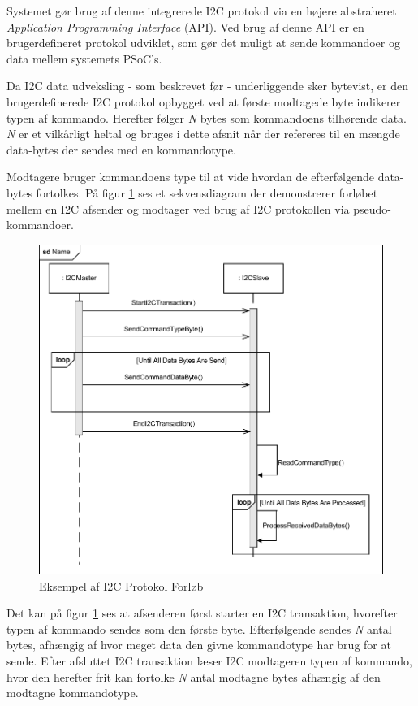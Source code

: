 Systemet gør brug af denne integrerede I2C protokol via en højere abstraheret \textit{Application Programming Interface} (API). Ved brug af denne API er en brugerdefineret protokol udviklet, som gør det muligt at sende kommandoer og data mellem systemets PSoC's.

Da I2C data udveksling - som beskrevet før - underliggende sker bytevist, er den brugerdefinerede I2C protokol opbygget ved at første modtagede byte indikerer typen af kommando. Herefter følger \textit{N} bytes som kommandoens tilhørende data. \textit{N} er et vilkårligt heltal og bruges i dette afsnit når der refereres til en mængde data-bytes der sendes med en kommandotype.

Modtagere bruger kommandoens type til at vide hvordan de efterfølgende data-bytes fortolkes. På figur \ref{fig:I2CProtokolEksempel} ses et sekvensdiagram der demonstrerer forløbet mellem en I2C afsender og modtager ved brug af I2C protokollen via pseudo-kommandoer.

\begin{figure}[H]
	\centering
	\includegraphics[width=\textwidth] {Systemarkitektur/images/I2CProtocol}
	\caption{Eksempel af I2C Protokol Forløb}
	\label{fig:I2CProtokolEksempel}
\end{figure}

Det kan på figur \ref{fig:I2CProtokolEksempel} ses at afsenderen først starter en I2C transaktion, hvorefter typen af kommando sendes som den første byte. Efterfølgende sendes \textit{N} antal bytes, afhængig af hvor meget data den givne kommandotype har brug for at sende. Efter afsluttet I2C transaktion læser I2C modtageren typen af kommando, hvor den herefter frit kan fortolke \textit{N} antal modtagne bytes afhængig af den modtagne kommandotype.

